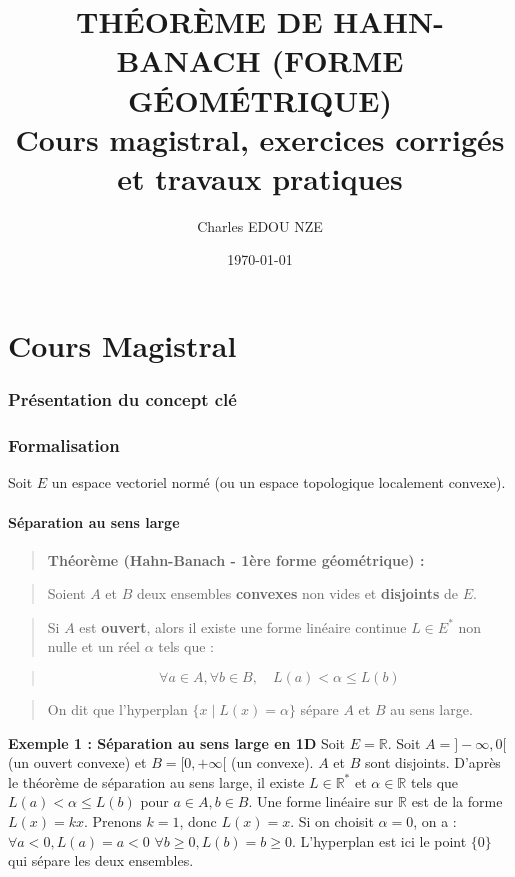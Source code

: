 \documentclass[11pt,a4paper]{article}
\title{\Huge THÉORÈME DE HAHN-BANACH (FORME GÉOMÉTRIQUE) \\ \large Cours magistral, exercices corrigés et travaux pratiques}
\author{\Large Charles EDOU NZE}
\date{\today}
\begin{document}
\maketitle
\tableofcontents
\newpage

\part{Cours Magistral}


\section{Présentation du concept clé}




\section{Formalisation}

Soit $E$ un espace vectoriel normé (ou un espace topologique localement convexe).

\subsection{Séparation au sens large}

\begin{quote}\textbf{Théorème (Hahn-Banach - 1ère forme géométrique) :}\end{quote}
\begin{quote}Soient $A$ et $B$ deux ensembles \textbf{convexes} non vides et \textbf{disjoints} de $E$.\end{quote}
\begin{quote}Si $A$ est \textbf{ouvert}, alors il existe une forme linéaire continue $L \in E^*$ non nulle et un réel $\alpha$ tels que :\end{quote}
\begin{quote}$$\forall a \in A, \forall b \in B, \quad L(a) < \alpha \le L(b)$$\end{quote}
\begin{quote}On dit que l'hyperplan $\{ x \mid L(x) = \alpha \}$ sépare $A$ et $B$ au sens large.\end{quote}


\textbf{Exemple 1 : Séparation au sens large en 1D}
Soit $E=\mathbb{R}$. Soit $A = ]-\infty, 0[$ (un ouvert convexe) et $B = [0, +\infty[$ (un convexe). $A$ et $B$ sont disjoints.
D'après le théorème de séparation au sens large, il existe $L \in \mathbb{R}^*$ et $\alpha \in \mathbb{R}$ tels que $L(a) < \alpha \le L(b)$ pour $a\in A, b\in B$.
Une forme linéaire sur $\mathbb{R}$ est de la forme $L(x) = kx$.
Prenons $k=1$, donc $L(x) = x$. Si on choisit $\alpha = 0$, on a :
$\forall a < 0, L(a) = a < 0$
$\forall b \ge 0, L(b) = b \ge 0$.
L'hyperplan est ici le point $\{0\}$ qui sépare les deux ensembles.
\end{document}
